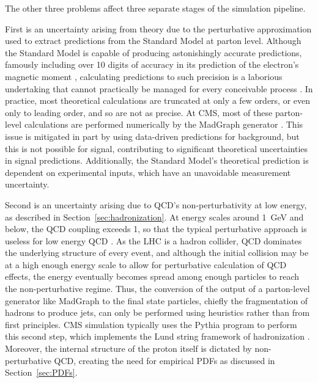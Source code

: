   The other three problems affect three separate stages of the simulation pipeline.

  First is an uncertainty arising from theory due to the perturbative approximation used to extract predictions from the Standard Model at parton level.
  Although the Standard Model is capable of producing astonishingly accurate predictions, famously including over 10 digits of accuracy in its prediction of the electron's magnetic moment \cite{electronmu_exp}, calculating predictions to such precision is a laborious undertaking that cannot practically be managed for every conceivable process \cite{electronmu_th}.
  In practice, most theoretical calculations are truncated at only a few orders, or even only to leading order, and so are not as precise.
  At CMS, most of these parton-level calculations are performed numerically by the MadGraph generator \cite{madgraph}.
  This issue is mitigated in part by using data-driven predictions for background, but this is not possible for signal, contributing to significant theoretical uncertainties in signal predictions.
  Additionally, the Standard Model's theoretical prediction is dependent on experimental inputs, which have an unavoidable measurement uncertainty.

  Second is an uncertainty arising due to QCD's non-perturbativity at low energy, as described in Section~\ref{sec:hadronization}.
  At energy scales around 1~GeV and below, the QCD coupling exceeds 1, so that the typical perturbative approach is useless for low energy QCD \cite{qcd_coupling}.
  As the LHC is a hadron collider, QCD dominates the underlying structure of every event, and although the initial collision may be at a high enough energy scale to allow for perturbative calculation of QCD effects, the energy eventually becomes spread among enough particles to reach the non-perturbative regime.
  Thus, the conversion of the output of a parton-level generator like MadGraph to the final state particles, chiefly the fragmentation of hadrons to produce jets, can only be performed using heuristics rather than from first principles.
  CMS simulation typically uses the Pythia program to perform this second step, which implements the Lund string framework of hadronization \cite{pythia}.
  Moreover, the internal structure of the proton itself is dictated by non-perturbative QCD, creating the need for empirical PDFs as discussed in Section~\ref{sec:PDFs}.

